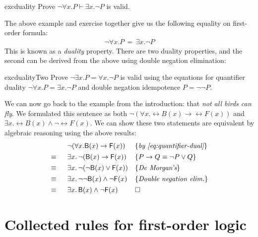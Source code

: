 \begin{restatable}{exc}{duality}
  Prove $\neg \forall x . P \vdash \exists x . \neg P$ is valid.
\end{restatable}
%
\noindent
The above example and exercise together give us the following equality
on first-order formula:
%
\begin{align}
\label{eq:quantifier-dual}
 \neg \forall x . P \, = \, \exists x . \neg P
\end{align}
This is known as a \emph{duality} property. There are two duality
properties, and the second can be derived from the above using
double negation elimination:
%
\begin{restatable}{exc}{dualityTwo}
  Prove $\neg \exists x . P = \forall x . \neg P$ is valid using
  the equations for quantifier duality
  $\neg \forall x . P = \exists x . \neg P$ and double negation
  idempotence $P = \neg\neg P$.
\end{restatable}
%
\begin{example}
  We can now go back to the example from the introduction: that
  \emph{not all birds can fly}. We formulated this sentence as both
  $\neg (\forall x . \rel{B}(x) \rightarrow \rel{F}(x))$ and
  $\exists x . \rel{B}(x) \wedge \neg \rel{F}(x)$.
  We can show these two statements are equivalent by algebraic
  reasoning using the above results:
%
\begin{align*}
\begin{array}{rll}
    & \neg (\forall x . \mathsf{B}(x) \rightarrow \mathsf{F}(x)) & \{\textit{by \eqref{eq:quantifier-dual}}\} \\[0.4em]
  \equiv \;\; &  \exists x . \, \neg (\mathsf{B}(x) \rightarrow
                \mathsf{F}(x)) & \{\textit{$P \rightarrow Q \equiv \neg P
                              \vee Q$}\} \\[0.4em]
  \equiv \;\; & \exists x . \,\neg (\neg \mathsf{B}(x) \vee \mathsf{F}(x))
& \{\textit{De Morgan's}\} \\[0.4em]
  \equiv \;\; & \exists x . \,\neg \neg \mathsf{B}(x) \wedge \neg
                \mathsf{F}(x)
& \{\textit{Double negation elim.}\} \\[0.4em]
  \equiv \;\; & \exists x . \,\mathsf{B}(x) \wedge \neg \mathsf{F}(x) & \Box
\end{array}
\end{align*}
\end{example}




\section{Collected rules for first-order logic}

